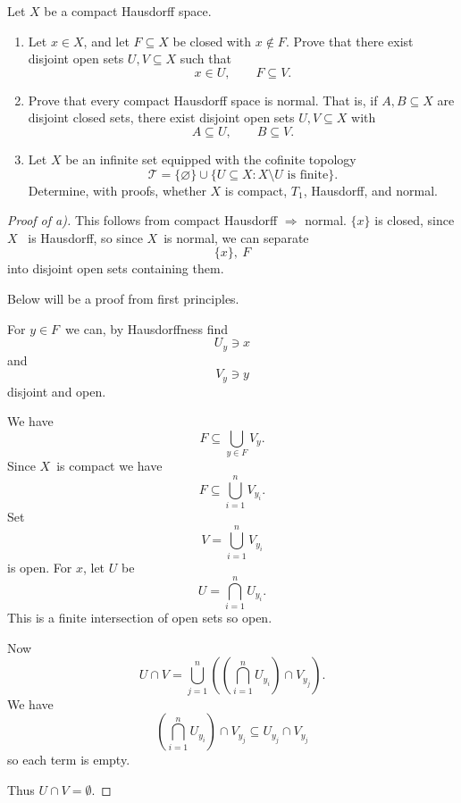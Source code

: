 \documentclass[11pt]{article}
\begin{document}
\begin{prob*}
    Let \(X\) be a compact Hausdorff space.

    \begin{enumerate}[label=\alph*)]
        \item Let \(x\in X\), and let \(F\subseteq X\)
        be closed with \(x\notin F\).
        Prove that there exist disjoint open sets
        \(U,V\subseteq X\) such that
        \[
            x\in U,\qquad F\subseteq V.
        \]

        \item Prove that every compact Hausdorff
        space is normal. That is, if \(A,B\subseteq X\)
        are disjoint closed sets, there exist
        disjoint open sets \(U,V\subseteq X\) with
        \[
            A\subseteq U,\qquad B\subseteq V.
        \]

        \item Let \(X\) be an infinite set equipped
        with the cofinite topology
        \[
            \mathcal T=\{\varnothing\}\cup
            \{U\subseteq X:
                X\setminus U\text{ is finite}\}.
        \]
        Determine, with proofs, whether \(X\) is
        compact, \(T_1\), Hausdorff, and normal.
    \end{enumerate}
\end{prob*}
\begin{proof}[Proof of a)]
    This follows from compact Hausdorff 
    $\Rightarrow$ normal. $\{x\}$ is closed, since $X$ 
    is Hausdorff, so since $X$ is normal, we can separate 
    \[
        \{x\},\ F
    \]
    into disjoint open sets containing them. 

    Below will be a proof from first principles. 

    For $y \in F$ we can, by Hausdorffness find 
    \[
        U_y \ni x 
    \]
    and 
    \[
        V_y \ni y
    \]
    disjoint and open. 

    We have 
    \[
        F \subseteq \bigcup_{y\in F} V_y. 
    \]
    Since $X$ is compact we have 
    \[
        F \subseteq \bigcup_{i=1}^n V_{y_i}. 
    \]
    Set 
    \[
        V = \bigcup_{i=1}^n V_{y_i}
    \]
    is open. 
    For $x$, let $U$ be 
    \[
        U = \bigcap_{i=1}^n U_{y_i}.
    \]
    This is a finite intersection of open sets so open. 

    Now 
    \[
        U \cap V = \bigcup_{j=1}^n \left( 
        \left( \bigcap_{i=1}^n U_{y_i} \right) \cap V_{y_j} \right).
    \]
    We have 
    \[
        \left( \bigcap_{i=1}^n U_{y_i} \right) 
        \cap V_{y_j} \subseteq U_{y_j} \cap V_{y_j}
    \]
    so each term is empty. 

    Thus $U\cap V = \emptyset$.

\end{proof}
\end{document}
